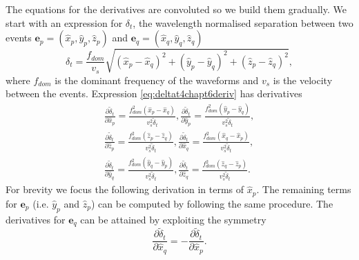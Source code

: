 \documentclass[extra]{gji}
\begin{document}
The equations for the derivatives are convoluted so we
build them gradually. We start with an expression for $\delta_t$, the wavelength normalised separation between two events
$\mathbf{e}_p= (\hat{x}_p,\hat{y}_p,\hat{z}_p)$ and $\mathbf{e}_q = (\hat{x}_q,\hat{y}_q,\hat{z}_q)$
\begin{equation}
\label{eq:deltat4chapt6deriv}
\delta_t = \frac{f_{dom}}{v_s}\sqrt{(\hat{x}_p-\hat{x}_q)^2 + (\hat{y}_p-\hat{y}_q)^2 +  (\hat{z}_p-\hat{z}_q)^2},
\end{equation}
where $f_{dom}$ is the dominant frequency of the waveforms and $v_s$ is the velocity between the events. Expression
\ref{eq:deltat4chapt6deriv} has derivatives
\begin{equation}
\label{eq-partial-xyz1}
\begin{array}{l}
\frac{\partial \widetilde{\delta}_t}{\partial \hat{x}_p} = \frac{f_{dom}^2 (\hat{x}_p-\hat{x}_q)}{v_s^2 \widetilde{\delta}_t},
\frac{\partial \widetilde{\delta}_t}{\partial \hat{y}_p} = \frac{f_{dom}^2 (\hat{y}_p-\hat{y}_q)}{v_s^2 \widetilde{\delta}_t}, \\
\frac{\partial \widetilde{\delta}_t}{\partial \hat{z}_p} = \frac{f_{dom}^2 (\hat{z}_p-\hat{z}_q)}{v_s^2 \widetilde{\delta}_t},
\frac{\partial \widetilde{\delta}_t}{\partial \hat{x}_q} = \frac{f_{dom}^2 (\hat{x}_q-\hat{x}_p)}{v_s^2 \widetilde{\delta}_t}, \\
\frac{\partial \widetilde{\delta}_t}{\partial \hat{y}_q} = \frac{f_{dom}^2 (\hat{y}_q-\hat{y}_p)}{v_s^2 \widetilde{\delta}_t},
\frac{\partial \widetilde{\delta}_t}{\partial \hat{z}_q} = \frac{f_{dom}^2 (\hat{z}_q-\hat{z}_p)}{v_s^2 \widetilde{\delta}_t}.
\end{array}
\end{equation}
For brevity we focus the following derivation in terms of $\hat{x}_p$. The remaining terms for $\mathbf{e}_p$
(i.e. $\hat{y}_p$ and $\hat{z}_p$) can be computed
by following the same procedure. The derivatives for $\mathbf{e}_q$ can be attained by exploiting the symmetry
\begin{equation}
\label{eq:ep2eq-deriv-symmetry}
\frac{\partial \widetilde{\delta}_t}{\partial \hat{x}_q} = - \frac{\partial \widetilde{\delta}_t}{\partial \hat{x}_p}.
\end{equation}
\end{document}
